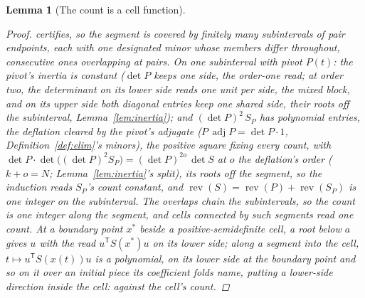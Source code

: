 \documentclass[11pt]{article}
\newtheorem{lemma}{Lemma}
\theoremstyle{definition}
\begin{document}
\begin{lemma}[The count is a cell function]
\begin{proof}
certifies, so the segment is covered by finitely many
subintervals of pair endpoints, each with one designated minor whose
members differ throughout, consecutive
ones overlapping at pairs. On one subinterval with pivot $P(t)$: the
pivot's inertia is constant ($\det P$ keeps one side, the order-one read; at
order two, the determinant on its lower side reads one unit per
side, the mixed block, and on its upper side both diagonal
entries keep one shared side, their roots off the subinterval,
Lemma~\ref{lem:inertia}); and
$(\det P)^2\,S_P$ has polynomial entries, the deflation cleared by
the pivot's adjugate
($P\,\operatorname{adj}P=\det P\cdot1$, Definition~\ref{def:elim}'s
minors), the positive square fixing every
count, with $\det P\cdot\det\big((\det P)^2S_P\big)
=(\det P)^{2o}\,\det S$ at $o$ the deflation's order
($k+o=N$; Lemma~\ref{lem:inertia}'s split), its
roots off the
segment, so the
induction reads $S_P$'s count constant, and
$\operatorname{rev}(S)=\operatorname{rev}(P)
+\operatorname{rev}(S_P)$ is one integer on the subinterval. The
overlaps chain the subintervals, so the count is one integer along the
segment, and cells connected by such segments read one count. At a
boundary point $x^*$ beside a positive-semidefinite cell, a root below $a$ gives
$u$ with the read $u^{\mathsf T}S(x^*)u$ on its lower side; along a segment into the cell,
$t\mapsto u^{\mathsf T}S(x(t))u$ is a polynomial, on its lower side at
the boundary point and so
on it over an initial piece its coefficient folds name, putting a
lower-side direction inside the cell: against the cell's count.
\end{proof}
\end{lemma}
\end{document}
